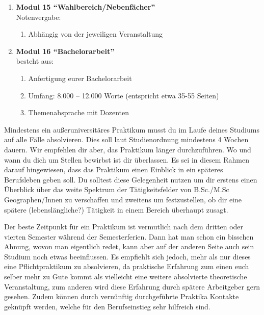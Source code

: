 \begin{enumerate}
 \item \textbf{Modul 15 ``Wahlbereich/Nebenfächer''}  \\
  Notenvergabe:
   \begin{enumerate}
    \item[] Abhängig von der jeweiligen Veranstaltung
   \end{enumerate}
 
 \item \textbf{Modul 16 ``Bachelorarbeit''}  \\ besteht aus:
  \begin{enumerate}
   \item Anfertigung eurer Bachelorarbeit 
   \item Umfang: 8.000 – 12.000 Worte (entspricht etwa 35-55 Seiten)
   \item Themenabsprache mit Dozenten
  \end{enumerate}




\end{enumerate}

\newpage

Mindestens ein außeruniversitäres Praktikum musst du im Laufe deines Studiums auf alle Fälle absolvieren. Dies soll laut Studienordnung mindestens 4 Wochen dauern. Wir empfehlen dir aber, das Praktikum länger durchzuführen. Wo und wann du dich um Stellen bewirbst ist dir überlassen. Es sei in diesem Rahmen darauf hingewiesen, dass das Praktikum einen Einblick in ein späteres Berufsleben geben soll. Du solltest diese Gelegenheit nutzen um dir erstens einen Überblick über das weite Spektrum der Tätigkeitsfelder von B.Sc./M.Sc Geographen/Innen zu verschaffen und zweitens um festzustellen, ob dir eine spätere (lebenslängliche?) Tätigkeit in einem Bereich überhaupt zusagt.

Der beste Zeitpunkt für ein Praktikum ist vermutlich nach dem dritten oder vierten Semester während der Semesterferien. Dann hat man schon ein bisschen Ahnung, wovon man eigentlich redet, kann aber auf der anderen Seite auch sein Studium noch etwas beeinﬂussen. Es empﬁehlt sich jedoch, mehr als nur dieses eine Pﬂichtpraktikum zu absolvieren, da praktische Erfahrung zum einen euch selber mehr zu Gute kommt als vielleicht eine weitere absolvierte theoretische Veranstaltung, zum anderen wird diese Erfahrung durch spätere Arbeitgeber gern gesehen. Zudem können durch vernünftig durchgeführte Praktika Kontakte geknüpft werden, welche für den Berufseinstieg sehr hilfreich sind.


